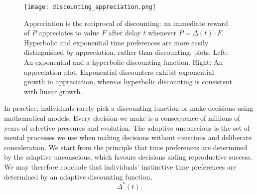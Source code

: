 \documentclass[titlepage, hidelinks, 12pt]{article}
\theoremstyle{plain}
\theoremstyle{remark}
\theoremstyle{definition}
\DeclareMathOperator{\hyp}{hyp}
\begin{document}
\begin{figure}[H]
    \centering
    \texttt{[image: discounting\_appreciation.png]}
    \caption{Appreciation is the reciprocal of discounting: an immediate reward of $P$ appreciates to value $F$ after delay $t$ whenever
        $P = \Delta(t)\cdot F$. 
        Hyperbolic and exponential time preferences are more easily distinguished by appreciation, rather than discounting, plots.
            Left: An exponential and a hyperbolic discounting function. Right: An appreciation plot. Exponential discounters exhibit exponential
        growth in appreciation, whereas hyperbolic discounting is consistent with linear growth.}
\end{figure}


%        


In practice, individuals rarely pick a discounting function or make decisions using mathematical models. 
Every decision we make is a consequence of millions of years of selective pressures and evolution. The adaptive unconscious \cite{wegner02} is 
the set of mental processes we use when making decisions without conscious and deliberate consideration. We start from the principle
that time preferences are determined by the adaptive unconscious,
which favours decisions aiding reproductive success. 
We may therefore conclude that individuals' instinctive time preferences are determined by an adaptive discounting function,
\begin{equation}
    \Delta^*(t).
    \label{eqn:adaptive_discounting}
\end{equation}
\end{document}
